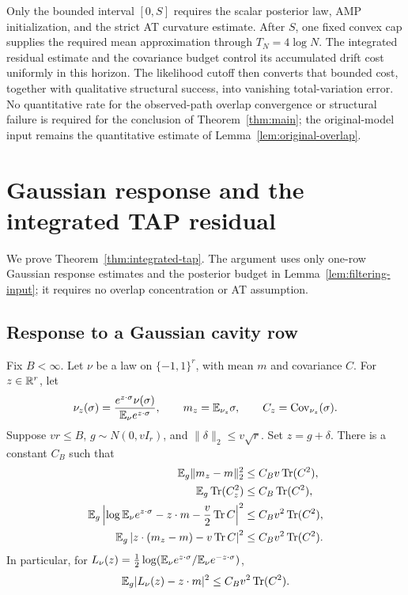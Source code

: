 \documentclass[11pt,reqno]{amsart}
\newcommand{\Cov}{\operatorname{Cov}}
\newcommand{\Tr}{\operatorname{Tr}}
\begin{document}
Only the bounded interval $[0,S]$ requires the scalar posterior law,
AMP initialization, and the strict AT curvature estimate. After $S$,
one fixed convex cap supplies the required mean approximation through
$T_N=4\log N$. The integrated residual estimate and the covariance
budget control its accumulated drift cost uniformly in this horizon.
The likelihood cutoff then converts that bounded cost, together with
qualitative structural success, into vanishing total-variation error.
No quantitative rate for the observed-path overlap convergence or structural failure is required for the conclusion of Theorem~\ref{thm:main}; the original-model input remains the quantitative estimate of Lemma~\ref{lem:original-overlap}.


\appendix

\section{Gaussian response and the integrated TAP residual}\label{sec:integrated-proof}

We prove Theorem~\ref{thm:integrated-tap}. The argument uses only one-row Gaussian response estimates and the posterior budget in Lemma~\ref{lem:filtering-input}; it requires no overlap concentration or AT assumption.

\subsection{Response to a Gaussian cavity row}

\begin{lem}\label{lem:response}
Fix $B<\infty$. Let $\nu$ be a law on $\{-1,1\}^r$, with mean $m$ and
covariance $C$. For $z\in{\mathbb{R}}^r$, let
\[
 \nu_z(\sigma)=\frac{e^{z\cdot\sigma}\nu(\sigma)}{
                    \bbE_\nu e^{z\cdot\sigma}},
 \qquad m_z=\bbE_{\nu_z}\sigma,\qquad C_z=\Cov_{\nu_z}(\sigma).
\]
Suppose $vr\le B$, $g\sim N(0,vI_r)$, and
$\|\delta\|_2\le v\sqrt r$. Set $z=g+\delta$. There is a constant $C_B$
such that
\begin{align*}
 \bbE_g\|m_z-m\|_2^2&\le C_Bv\Tr(C^2),\\
 \bbE_g\Tr(C_z^2)&\le C_B\Tr(C^2),\\
 \bbE_g\left|\log\bbE_\nu e^{z\cdot\sigma}
       -z\cdot m-\frac v2\Tr C\right|^2
       &\le C_Bv^2\Tr(C^2),\\
 \bbE_g\left|z\cdot(m_z-m)-v\Tr C\right|^2
       &\le C_Bv^2\Tr(C^2).
\end{align*}
In particular, for
$L_\nu(z)=\frac12\log({\mathbb{E}}_\nu e^{z\cdot\sigma}/{\mathbb{E}}_\nu e^{-z\cdot\sigma})$,
\[
 \bbE_g|L_\nu(z)-z\cdot m|^2\le C_Bv^2\Tr(C^2).
\]
\end{lem}
\end{document}

